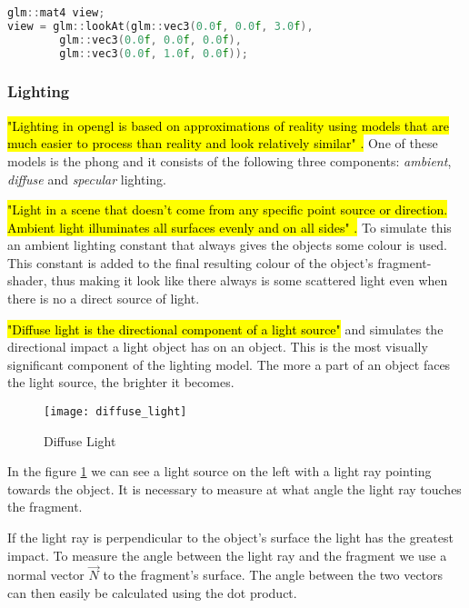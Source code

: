 \begin{lstlisting}[language=C++, caption={GLM lookAt function example}, label={code:lookat}]
glm::mat4 view;
view = glm::lookAt(glm::vec3(0.0f, 0.0f, 3.0f), 
		glm::vec3(0.0f, 0.0f, 0.0f), 
		glm::vec3(0.0f, 1.0f, 0.0f));
\end{lstlisting}


\subsubsection{Lighting}

\hl{"Lighting in \gls{opengl} is based on approximations of reality using models that are much easier to process than reality and look relatively similar" \cite{lightinglearnopengl}.} One of these models is the \gls{phong} and it consists of the following three components: \emph{ambient}, \emph{diffuse} and \emph{specular} lighting.


\hl{"Light in a scene that doesn't come from any specific point source or direction. Ambient light illuminates all surfaces evenly and on all sides" \cite{superbible}.} To simulate this an ambient lighting constant that always gives the objects some colour is used. This constant is added to the final resulting colour of the object's \gls{fragment-shader}, thus making it look like there always is some scattered light even when there is no a direct source of light.


\hl{"Diffuse light is the directional component of a light source"} \cite{superbible} and simulates the directional impact a light object has on an object. This is the most visually significant component of the lighting model. The more a part of an object faces the light source, the brighter it becomes.


\begin{figure}[h!]
	\centering
	\texttt{[image: diffuse\_light]}
	\caption{Diffuse Light \cite{lightinglearnopengl}}
	\label{fig:diffuse-light}
\end{figure}

In the figure \ref{fig:diffuse-light} we can see a light source on the left with a light ray pointing towards the object. It is necessary to measure at what angle the light ray touches the fragment. 

If the light ray is perpendicular to the object's surface the light has the greatest impact. To measure the angle between the light ray and the fragment we use a normal vector $\overrightarrow{N}$ \cite{normalvector} to the fragment's surface. The angle between the two vectors can then easily be calculated using the dot product.

